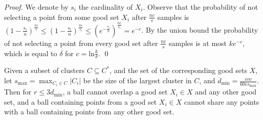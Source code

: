 \documentclass{llncs} \usepackage{algorithm}
\begin{document}
\begin{proof}
We denote by $s_{i}$ the cardinality of $X_{i}$.  Observe that the probability of not selecting a point from some good set $X_{i}$ after $\frac{nc}{s}$ samples is $(1 - \frac{s_{i}}{n})^{\frac{nc}{s}} \le (1 - \frac{s_{i}}{n})^{\frac{nc}{s_{i}}} \le (e^{-\frac{s_{i}}{n}})^{\frac{nc}{s_{i}}} = e^{-c}$.  By the union bound the probability of not selecting a point from every good set after $\frac{nc}{s}$ samples is at most $k e^{-c}$, which is equal to $\delta$ for $c = \textrm{ln}\frac{k}{\delta}$. \qed
\end{proof}



\begin{lemma}\label{lemma:noOverlap}
Given a subset of clusters $C \subseteq C^{\ast}$, and the set of the corresponding good sets $X$, let $s_{\max}= \max_{C_{i} \in C} \vert C_{i} \vert$ be the size of the largest cluster in $C$, and $d_{\min} = \frac{\alpha w}{60 \epsilon s_{\max}}$.  Then for $r \le 3 d_{\min}$, a ball cannot overlap a good set $X_{i} \in X$ and any other good set, and a ball containing points from a good set $X_{i} \in X$ cannot share any points with a ball containing points from any other good set.
\end{lemma}
\end{document}
